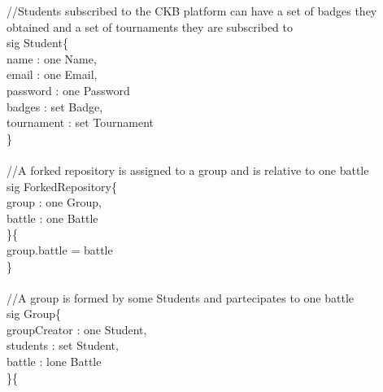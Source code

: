 \documentclass{article}
\begin{document}
{\color{gray}
\noindent//Students subscribed to the CKB platform can have a set of badges they obtained and a set of tournaments they are subscribed to\\
\color{blue}
sig
\color{black}
Student\{\\
\-\hspace{1cm}    name : \color{blue} one \color{black} Name,\\
\-\hspace{1cm}    email : \color{blue} one \color{black} Email,\\
\-\hspace{1cm}    password : \color{blue} one \color{black} Password\\
\-\hspace{1cm}    badges : \color{blue} set \color{black} Badge,\\
\-\hspace{1cm}    tournament : \color{blue} set \color{black} Tournament\\
\}\\
\color{gray}
\\
//A forked repository is assigned to a group and is relative to one battle\\
\color{blue}
sig
\color{black}
ForkedRepository\{\\
\-\hspace{1cm}    group : \color{blue} one \color{black} Group,\\
\-\hspace{1cm}    battle : \color{blue} one \color{black} Battle\\
\}\{\\
\-\hspace{1cm}    group.battle \color{blue} = \color{black} battle\\
\}\\
\\
\color{gray}
//A group is formed by some Students and partecipates to one battle\\
\color{blue}
sig
\color{black}
Group\{\\
\-\hspace{1cm}    groupCreator : \color{blue} one \color{black} Student,\\
\-\hspace{1cm}    students : \color{blue} set \color{black} Student,\\
\-\hspace{1cm}    battle : \color{blue} lone \color{black} Battle\\
\}\{\\
}
\end{document}
